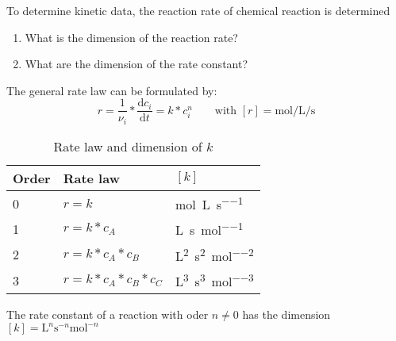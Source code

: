 
\begin{question}
To determine kinetic data, the reaction rate of chemical reaction is determined
\renewcommand{\labelenumi}{(\alph{enumi})}
\begin{enumerate}
\item What is the dimension of the reaction rate?
\item What are the dimension of the rate constant?
\end{enumerate}
\end{question}

\begin{solution}
The general rate law can be formulated by:
\begin{equation}
 r = \frac{1}{\nu_i} * \frac{\mathrm{d}c_i}{\mathrm{d}t} = k * c_i^n \qquad \text{with } [r] = \si{\mole\per\liter\per\second}
\end{equation}
%
\begin{table}[H]
 \centering
 \caption{Rate law and dimension of $k$}
 \begin{tabular}{l l l}
 \toprule
  Order & Rate law & $[k]$ \\
  \midrule
  0 & $r = k$               & \si{\mole\per\liter\per\second} \\
  1 & $r = k*c_A $          & \si{\liter\per\second\per\mole} \\
  2 & $r = k*c_A*c_B $      & \si{\square\liter\per\square\second\per\square\mole} \\
  3 & $r = k*c_A*c_B*c_C $  & \si{\cubic\liter\per\cubic\second\per\cubic\mole} \\
  \bottomrule
 \end{tabular}
\end{table}
The rate constant of a reaction with oder $n \neq 0$ has the dimension $[k] = \si{\liter\tothe{n}\second\tothe{-n}\mole\tothe{-n}}$
\end{solution}

